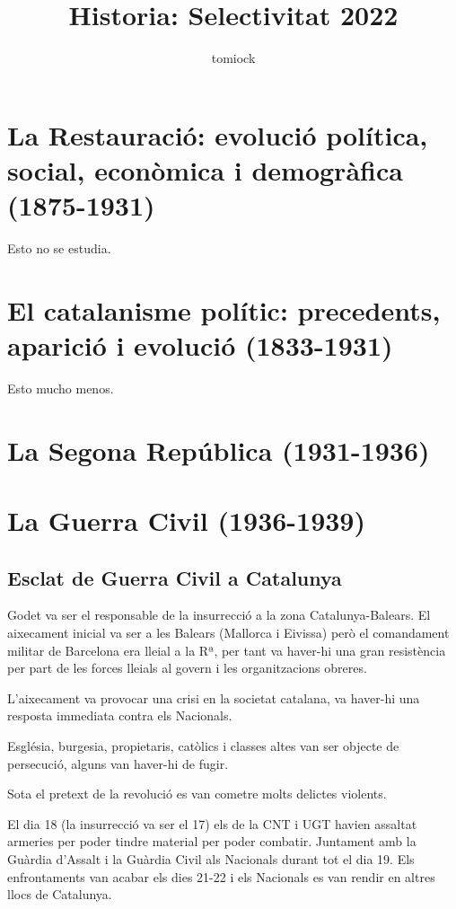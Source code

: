 \documentclass[arial,a4paper,print]{article}
\title{Historia: Selectivitat 2022}
\author{tomiock}
\begin{document}
	
\maketitle

\section{La Restauració: evolució política, social, econòmica i demogràfica (1875-1931)}
Esto no se estudia. 

\section{El catalanisme polític: precedents, aparició i evolució (1833-1931)}
Esto mucho menos. 

\section{La Segona República (1931-1936)}

\section{La Guerra Civil (1936-1939)}

\subsection{Esclat de Guerra Civil a Catalunya}
Godet va ser el responsable de la insurrecció a la zona Catalunya-Balears. El aixecament inicial va ser a les Balears (Mallorca i Eivissa) però el comandament militar de Barcelona era lleial a la Rª, per tant va haver-hi una gran resistència per part de les forces lleials al govern i les organitzacions obreres. 

L'aixecament va provocar una crisi en la societat catalana, va haver-hi una resposta immediata contra els Nacionals. 

Església, burgesia, propietaris, catòlics i classes altes van ser objecte de persecució, alguns van haver-hi de fugir. 

Sota el pretext de la revolució es van cometre molts delictes violents. 

El dia 18 (la insurrecció va ser el 17) els de la CNT i UGT havien assaltat armeries per poder tindre material per poder combatir. Juntament amb la Guàrdia d'Assalt i la Guàrdia Civil als Nacionals durant tot el dia 19. Els enfrontaments van acabar els dies 21-22 i els Nacionals es van rendir en altres llocs de Catalunya. 
\end{document}
